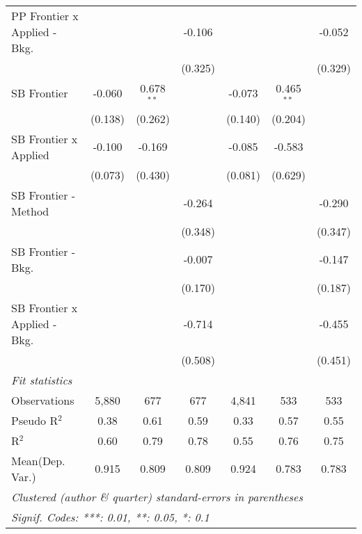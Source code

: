 \begin{tabular}{lcccccc}
   PP Frontier x Applied - Bkg.   &              &              & -0.106       &             &              & -0.052\\   
                                  &              &              & (0.325)      &             &              & (0.329)\\   
   SB Frontier                    & -0.060       & 0.678$^{**}$ &              & -0.073      & 0.465$^{**}$ &   \\   
                                  & (0.138)      & (0.262)      &              & (0.140)     & (0.204)      &   \\   
   SB Frontier x Applied          & -0.100       & -0.169       &              & -0.085      & -0.583       &   \\   
                                  & (0.073)      & (0.430)      &              & (0.081)     & (0.629)      &   \\   
   SB Frontier - Method           &              &              & -0.264       &             &              & -0.290\\   
                                  &              &              & (0.348)      &             &              & (0.347)\\   
   SB Frontier - Bkg.             &              &              & -0.007       &             &              & -0.147\\   
                                  &              &              & (0.170)      &             &              & (0.187)\\   
   SB Frontier x Applied - Bkg.   &              &              & -0.714       &             &              & -0.455\\   
                                  &              &              & (0.508)      &             &              & (0.451)\\   
   \midrule
   \emph{Fit statistics}\\
   Observations                   & 5,880        & 677          & 677          & 4,841       & 533          & 533\\  
   Pseudo R$^2$                   & 0.38         & 0.61         & 0.59         & 0.33        & 0.57         & 0.55\\  
   R$^2$                          & 0.60         & 0.79         & 0.78         & 0.55        & 0.76         & 0.75\\  
Mean(Dep. Var.) & 0.915 & 0.809 & 0.809 & 0.924 & 0.783 & 0.783 \\
   \midrule \midrule
   \multicolumn{7}{l}{\emph{Clustered (author \& quarter) standard-errors in parentheses}}\\
   \multicolumn{7}{l}{\emph{Signif. Codes: ***: 0.01, **: 0.05, *: 0.1}}\\
\end{tabular}
\par\endgroup
